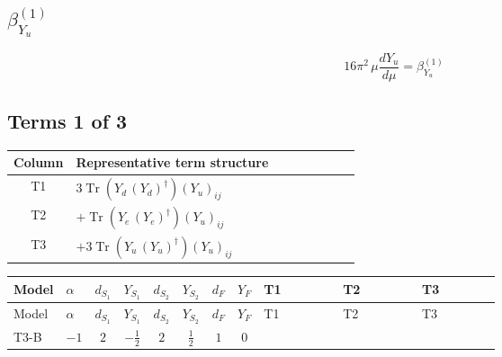 \documentclass[8pt]{article}
\begin{document}
\begin{landscape}
\section*{$\beta_{Y_u}^{(1)}$}
\[16\pi^2\,\mu\frac{d Y_u}{d\mu}=\beta_{Y_u}^{(1)}\]
\subsection*{Terms 1 of 3}
\begin{center}
\begin{tabular}{@{}c >{\raggedright\arraybackslash}p{0.82\linewidth}@{}}
\toprule
Column & Representative term structure \\
\midrule
T1 & \(\displaystyle 3 \operatorname{Tr}\!\left({Y_d}\,\left({Y_d}\right)^{\dagger}\right) \left({Y_u}\right)_{ij}\) \\
\midrule
T2 & \(\displaystyle +\operatorname{Tr}\!\left({Y_e}\,\left({Y_e}\right)^{\dagger}\right) \left({Y_u}\right)_{ij}\) \\
\midrule
T3 & \(\displaystyle +3 \operatorname{Tr}\!\left({Y_u}\,\left({Y_u}\right)^{\dagger}\right) \left({Y_u}\right)_{ij}\) \\
\midrule
\bottomrule
\end{tabular}
\end{center}
\smallskip
\tiny
\begin{longtable}{@{}llcccccc >{\raggedright\arraybackslash}p{0.21\linewidth} >{\raggedright\arraybackslash}p{0.21\linewidth} >{\raggedright\arraybackslash}p{0.21\linewidth}@{}}
\toprule
Model & $\alpha$ & $d_{S_1}$ & $Y_{S_1}$ & $d_{S_2}$ & $Y_{S_2}$ & $d_F$ & $Y_F$ & T1 & T2 & T3 \\
\midrule
\endfirsthead
\toprule
Model & $\alpha$ & $d_{S_1}$ & $Y_{S_1}$ & $d_{S_2}$ & $Y_{S_2}$ & $d_F$ & $Y_F$ & T1 & T2 & T3 \\
\midrule
\endhead
T3-B & $-1$ & $2$ & $-\frac{1}{2}$ & $2$ & $\frac{1}{2}$ & $1$ & $0$ & \scriptsize\adjustbox{max width=\linewidth}{$\begin{gathered} 3 \operatorname{Tr}\!\left({Y_d}\,\left({Y_d}\right)^{\dagger}\right) \left({Y_u}\right)_{ij}\end{gathered}$} & \scriptsize\adjustbox{max width=\linewidth}{$\begin{gathered} +\operatorname{Tr}\!\left({Y_e}\,\left({Y_e}\right)^{\dagger}\right) \left({Y_u}\right)_{ij}\end{gathered}$} & \scriptsize\adjustbox{max width=\linewidth}{$\begin{gathered} +3 \operatorname{Tr}\!\left({Y_u}\,\left({Y_u}\right)^{\dagger}\right) \left({Y_u}\right)_{ij}\end{gathered}$} \\

\end{longtable}
\end{landscape}
\end{document}
